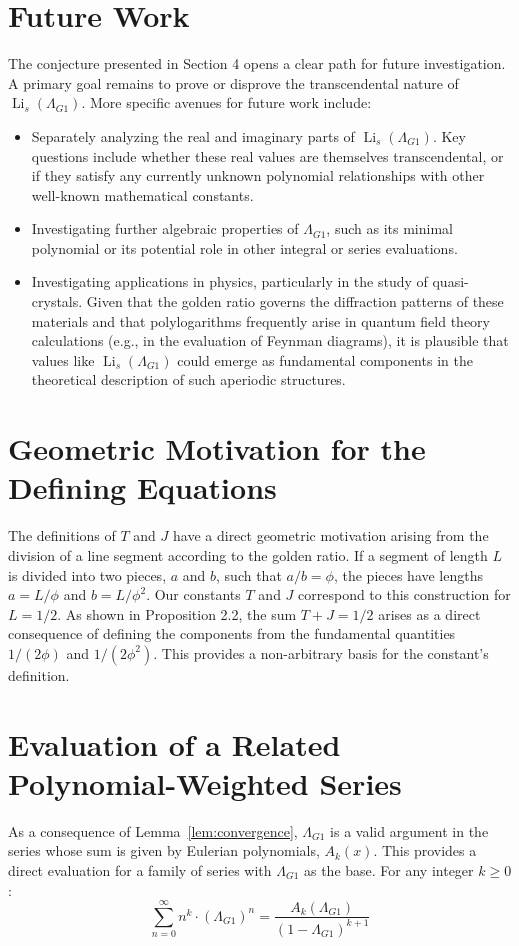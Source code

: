 \documentclass{amsart}
\theoremstyle{plain}
\theoremstyle{definition}
\theoremstyle{remark}
\DeclareMathOperator{\Li}{Li} %
\newcommand{\LambdaG}{\Lambda_{G1}}
\newcommand{\phiG}{\phi}
\begin{document}
\section{Future Work}
The conjecture presented in Section 4 opens a clear path for future investigation. A primary goal remains to prove or disprove the transcendental nature of $\Li_s(\LambdaG)$. More specific avenues for future work include:
\begin{itemize}
    \item Separately analyzing the real and imaginary parts of $\Li_s(\LambdaG)$. Key questions include whether these real values are themselves transcendental, or if they satisfy any currently unknown polynomial relationships with other well-known mathematical constants.
    \item Investigating further algebraic properties of $\LambdaG$, such as its minimal polynomial or its potential role in other integral or series evaluations.
    \item Investigating applications in physics, particularly in the study of quasi-crystals. Given that the golden ratio governs the diffraction patterns of these materials and that polylogarithms frequently arise in quantum field theory calculations (e.g., in the evaluation of Feynman diagrams), it is plausible that values like $\Li_s(\LambdaG)$ could emerge as fundamental components in the theoretical description of such aperiodic structures.
\end{itemize}

\appendix
\section{Geometric Motivation for the Defining Equations}
The definitions of $T$ and $J$ have a direct geometric motivation arising from the division of a line segment according to the golden ratio. If a segment of length $L$ is divided into two pieces, $a$ and $b$, such that $a/b = \phiG$, the pieces have lengths $a=L/\phiG$ and $b=L/\phiG^2$. Our constants $T$ and $J$ correspond to this construction for $L=1/2$. As shown in Proposition 2.2, the sum $T+J=1/2$ arises as a direct consequence of defining the components from the fundamental quantities $1/(2\phiG)$ and $1/(2\phiG^2)$. This provides a non-arbitrary basis for the constant's definition.

\section{Evaluation of a Related Polynomial-Weighted Series}
As a consequence of Lemma~\ref{lem:convergence}, $\LambdaG$ is a valid argument in the series whose sum is given by Eulerian polynomials, $A_k(x)$. This provides a direct evaluation for a family of series with $\LambdaG$ as the base. For any integer $k \ge 0$:
$$ \sum_{n=0}^{\infty} n^k \cdot (\LambdaG)^n = \frac{A_k(\LambdaG)}{(1-\LambdaG)^{k+1}} $$ 
\end{document}
